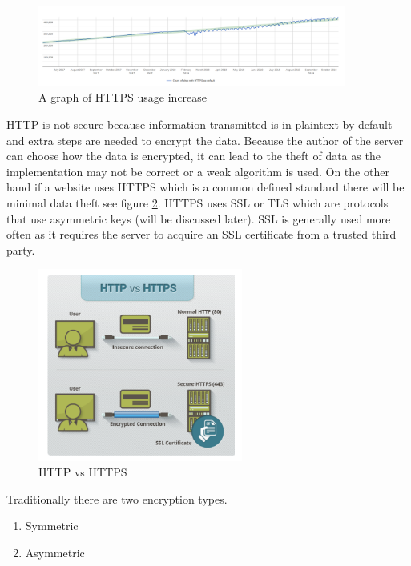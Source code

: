 \begin{figure}[ht]
  \centering
      \includegraphics[width=0.9\textwidth]{Figures/httpsRise.png}
  \caption[A graph of HTTPS usage increase]{A graph of HTTPS usage increase\cite{https}}
  \label{fig:httpsRise}
\end{figure}

HTTP is not secure because information transmitted is in plaintext by default and extra steps are needed to encrypt the data. Because the author of the server can choose how the data is encrypted, it can lead to the theft of data as the implementation may not be correct or a weak algorithm is used.
On the other hand if a website uses HTTPS which is a common defined standard there will be minimal data theft see figure \ref{fig:https1}. HTTPS uses SSL or TLS which are protocols that use asymmetric keys (will be discussed later). SSL is generally used more often as it requires the server to acquire an SSL certificate from a trusted third party.

\begin{figure}[ht]
  \centering
      \includegraphics[width=0.6\textwidth]{Figures/httpsVsHttp.png}
  \caption[HTTP vs HTTPS]{HTTP vs HTTPS\cite{https1}}
  \label{fig:https1}
\end{figure}



Traditionally there are two encryption types.
\begin{enumerate}
    \item Symmetric
    \item Asymmetric
\end{enumerate}

